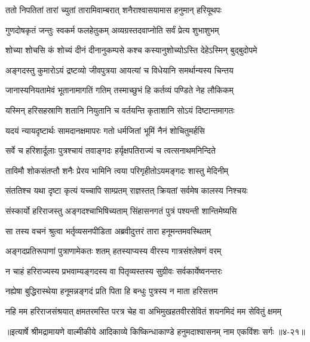 
\twolineshloka
{ततो निपतितां तारां च्युतां तारामिवाम्बरात्}
{शनैराश्वासयामास हनुमान् हरियूथपः} %

\twolineshloka
{गुणदोषकृतं जन्तुः स्वकर्म फलहेतुकम्}
{अव्यग्रस्तदवाप्नोति सर्वं प्रेत्य शुभाशुभम्} %

\twolineshloka
{शोच्या शोचसि कं शोच्यं दीनं दीनानुकम्पसे}
{कश्च कस्यानुशोच्योऽस्ति देहेऽस्मिन् बुद्बुदोपमे} %

\twolineshloka
{अङ्गदस्तु कुमारोऽयं द्रष्टव्यो जीवपुत्रया}
{आयत्यां च विधेयानि समर्थान्यस्य चिन्तय} %

\twolineshloka
{जानास्यनियतामेवं भूतानामागतिं गतिम्}
{तस्माच्छुभं हि कर्तव्यं पण्डिते नेह लौकिकम्} %

\twolineshloka
{यस्मिन् हरिसहस्राणि शतानि नियुतानि च}
{वर्तयन्ति कृताशानि सोऽयं दिष्टान्तमागतः} %

\twolineshloka
{यदयं न्यायदृष्टार्थः सामदानक्षमापरः}
{गतो धर्मजितां भूमिं नैनं शोचितुमर्हसि} %

\twolineshloka
{सर्वे च हरिशार्दूलाः पुत्रश्चायं तवाङ्गदः}
{हर्यृक्षपतिराज्यं च त्वत्सनाथमनिन्दिते} %

\twolineshloka
{ताविमौ शोकसंतप्तौ शनैः प्रेरय भामिनि}
{त्वया परिगृहीतोऽयमङ्गदः शास्तु मेदिनीम्} %

\twolineshloka
{संततिश्च यथा दृष्टा कृत्यं यच्चापि साम्प्रतम्}
{राज्ञस्तत् क्रियतां सर्वमेष कालस्य निश्चयः} %

\twolineshloka
{संस्कार्यो हरिराजस्तु अङ्गदश्चाभिषिच्यताम्}
{सिंहासनगतं पुत्रं पश्यन्ती शान्तिमेष्यसि} %

\twolineshloka
{सा तस्य वचनं श्रुत्वा भर्तृव्यसनपीडिता}
{अब्रवीदुत्तरं तारा हनूमन्तमवस्थितम्} %

\twolineshloka
{अङ्गदप्रतिरूपाणां पुत्राणामेकतः शतम्}
{हतस्याप्यस्य वीरस्य गात्रसंश्लेषणं वरम्} %

\twolineshloka
{न चाहं हरिराज्यस्य प्रभवाम्यङ्गदस्य वा}
{पितृव्यस्तस्य सुग्रीवः सर्वकार्येष्वनन्तरः} %

\twolineshloka
{नह्येषा बुद्धिरास्थेया हनूमन्नङ्गदं प्रति}
{पिता हि बन्धुः पुत्रस्य न माता हरिसत्तम} %

\twolineshloka
{नहि मम हरिराजसंश्रयात् क्षमतरमस्ति परत्र चेह वा}
{अभिमुखहतवीरसेवितं शयनमिदं मम सेवितुं क्षमम्} %


॥इत्यार्षे श्रीमद्रामायणे वाल्मीकीये आदिकाव्ये किष्किन्धाकाण्डे हनुमदाश्वासनम् नाम एकविंशः सर्गः ॥४-२१॥
